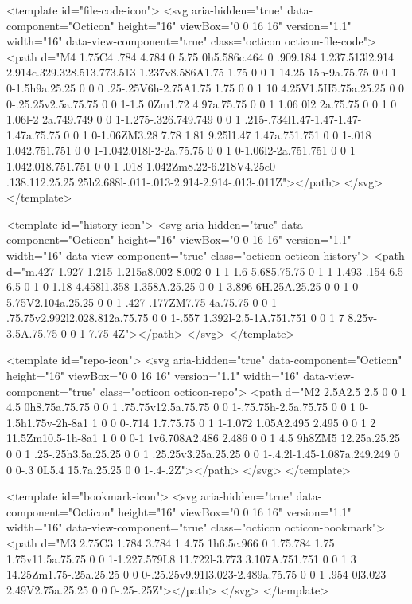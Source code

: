 <template id="file-code-icon">
  <svg aria-hidden="true" data-component="Octicon" height="16" viewBox="0 0 16 16" version="1.1" width="16" data-view-component="true" class="octicon octicon-file-code">
    <path d="M4 1.75C4 .784 4.784 0 5.75 0h5.586c.464 0 .909.184 1.237.513l2.914 2.914c.329.328.513.773.513 1.237v8.586A1.75 1.75 0 0 1 14.25 15h-9a.75.75 0 0 1 0-1.5h9a.25.25 0 0 0 .25-.25V6h-2.75A1.75 1.75 0 0 1 10 4.25V1.5H5.75a.25.25 0 0 0-.25.25v2.5a.75.75 0 0 1-1.5 0Zm1.72 4.97a.75.75 0 0 1 1.06 0l2 2a.75.75 0 0 1 0 1.06l-2 2a.749.749 0 0 1-1.275-.326.749.749 0 0 1 .215-.734l1.47-1.47-1.47-1.47a.75.75 0 0 1 0-1.06ZM3.28 7.78 1.81 9.25l1.47 1.47a.751.751 0 0 1-.018 1.042.751.751 0 0 1-1.042.018l-2-2a.75.75 0 0 1 0-1.06l2-2a.751.751 0 0 1 1.042.018.751.751 0 0 1 .018 1.042Zm8.22-6.218V4.25c0 .138.112.25.25.25h2.688l-.011-.013-2.914-2.914-.013-.011Z"></path>
</svg>
</template>

<template id="history-icon">
  <svg aria-hidden="true" data-component="Octicon" height="16" viewBox="0 0 16 16" version="1.1" width="16" data-view-component="true" class="octicon octicon-history">
    <path d="m.427 1.927 1.215 1.215a8.002 8.002 0 1 1-1.6 5.685.75.75 0 1 1 1.493-.154 6.5 6.5 0 1 0 1.18-4.458l1.358 1.358A.25.25 0 0 1 3.896 6H.25A.25.25 0 0 1 0 5.75V2.104a.25.25 0 0 1 .427-.177ZM7.75 4a.75.75 0 0 1 .75.75v2.992l2.028.812a.75.75 0 0 1-.557 1.392l-2.5-1A.751.751 0 0 1 7 8.25v-3.5A.75.75 0 0 1 7.75 4Z"></path>
</svg>
</template>

<template id="repo-icon">
  <svg aria-hidden="true" data-component="Octicon" height="16" viewBox="0 0 16 16" version="1.1" width="16" data-view-component="true" class="octicon octicon-repo">
    <path d="M2 2.5A2.5 2.5 0 0 1 4.5 0h8.75a.75.75 0 0 1 .75.75v12.5a.75.75 0 0 1-.75.75h-2.5a.75.75 0 0 1 0-1.5h1.75v-2h-8a1 1 0 0 0-.714 1.7.75.75 0 1 1-1.072 1.05A2.495 2.495 0 0 1 2 11.5Zm10.5-1h-8a1 1 0 0 0-1 1v6.708A2.486 2.486 0 0 1 4.5 9h8ZM5 12.25a.25.25 0 0 1 .25-.25h3.5a.25.25 0 0 1 .25.25v3.25a.25.25 0 0 1-.4.2l-1.45-1.087a.249.249 0 0 0-.3 0L5.4 15.7a.25.25 0 0 1-.4-.2Z"></path>
</svg>
</template>

<template id="bookmark-icon">
  <svg aria-hidden="true" data-component="Octicon" height="16" viewBox="0 0 16 16" version="1.1" width="16" data-view-component="true" class="octicon octicon-bookmark">
    <path d="M3 2.75C3 1.784 3.784 1 4.75 1h6.5c.966 0 1.75.784 1.75 1.75v11.5a.75.75 0 0 1-1.227.579L8 11.722l-3.773 3.107A.751.751 0 0 1 3 14.25Zm1.75-.25a.25.25 0 0 0-.25.25v9.91l3.023-2.489a.75.75 0 0 1 .954 0l3.023 2.49V2.75a.25.25 0 0 0-.25-.25Z"></path>
</svg>
</template>

